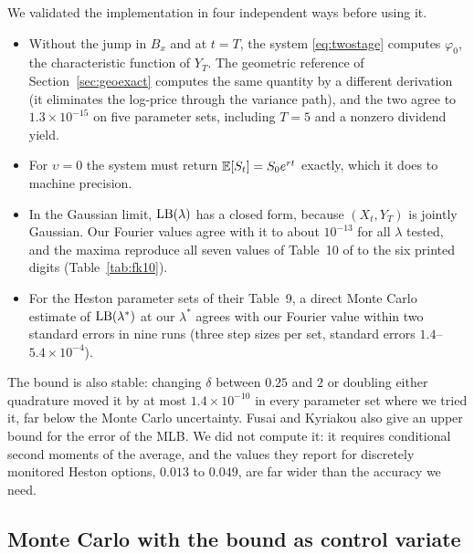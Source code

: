 We validated the implementation in four independent ways before using it.
\begin{itemize}
\item Without the jump in $B_x$ and at $t=T$, the system \eqref{eq:twostage} computes $\varphi_0$, the
characteristic function of $Y_T$. The geometric reference of Section~\ref{sec:geoexact} computes the same
quantity by a different derivation (it eliminates the log-price through the variance path), and the two
agree to $1.3\times10^{-15}$ on five parameter sets, including $T=5$ and a nonzero dividend yield.
\item For $\upsilon=0$ the system must return $\mathbb{E}[S_t]=S_0e^{rt}$ exactly, which it does to machine
precision.
\item In the Gaussian limit, $\mathrm{LB}(\lambda)$ has a closed form, because $(X_t,Y_T)$ is jointly Gaussian.
Our Fourier values agree with it to about $10^{-13}$ for all $\lambda$ tested, and the maxima reproduce all
seven values of Table~10 of \citet{FusaiKyriakou2016} to the six printed digits
(Table~\ref{tab:fk10}).
\item For the Heston parameter sets of their Table~9, a direct Monte Carlo estimate of $\mathrm{LB}(\lambda^\ast)$
at our $\lambda^\ast$ agrees with our Fourier value within two standard errors in nine runs
(three step sizes per set, standard errors $1.4$--$5.4\times10^{-4}$).
\end{itemize}
The bound is also stable: changing $\delta$ between $0.25$ and $2$ or doubling either quadrature moved it
by at most $1.4\times10^{-10}$ in every parameter set where we tried it, far below the Monte Carlo
uncertainty. Fusai and Kyriakou also give an upper bound for the error of the MLB. We did not
compute it: it requires conditional second moments of the average, and the values they report for
discretely monitored Heston options, $0.013$ to $0.049$, are far wider than the accuracy we need.

\subsection{Monte Carlo with the bound as control variate}\label{sec:e8}

